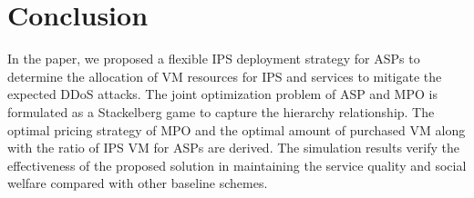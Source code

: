 \documentclass[conference]{IEEEtran}
\begin{document}
\section{Conclusion} \label{sec:conclusion}
In the paper, we proposed a flexible IPS deployment strategy for ASPs to determine the allocation of VM resources for IPS and services to mitigate the expected DDoS attacks. The joint optimization problem of ASP and MPO is formulated as a Stackelberg game to capture the hierarchy relationship. The optimal pricing strategy of MPO and the optimal amount of purchased VM along with the ratio of IPS VM for ASPs are derived. The simulation results verify the effectiveness of the proposed solution in maintaining the service quality and social welfare compared with other baseline schemes.




\end{document}
